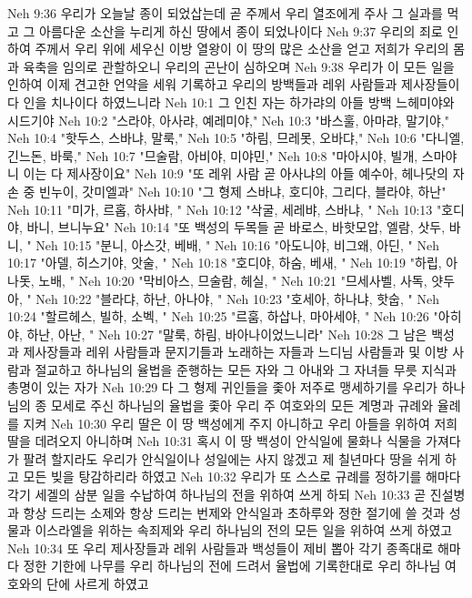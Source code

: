 Neh 9:36  우리가 오늘날 종이 되었삽는데 곧 주께서 우리 열조에게 주사 그 실과를 먹고 그 아름다운 소산을 누리게 하신 땅에서 종이 되었나이다
Neh 9:37  우리의 죄로 인하여 주께서 우리 위에 세우신 이방 열왕이 이 땅의 많은 소산을 얻고 저희가 우리의 몸과 육축을 임의로 관할하오니 우리의 곤난이 심하오며
Neh 9:38  우리가 이 모든 일을 인하여 이제 견고한 언약을 세워 기록하고 우리의 방백들과 레위 사람들과 제사장들이 다 인을 치나이다 하였느니라
Neh 10:1  그 인친 자는 하가랴의 아들 방백 느헤미야와 시드기야
Neh 10:2  "스라야, 아사랴, 예레미야,"
Neh 10:3  "바스훌, 아마랴, 말기야,"
Neh 10:4  "핫두스, 스바냐, 말룩,"
Neh 10:5  "하림, 므레못, 오바댜,"
Neh 10:6  "다니엘, 긴느돈, 바룩,"
Neh 10:7  "므술람, 아비야, 미야민,"
Neh 10:8  "마아시야, 빌개, 스마야니 이는 다 제사장이요"
Neh 10:9  "또 레위 사람 곧 아사냐의 아들 예수아, 헤나닷의 자손 중 빈누이, 갓미엘과"
Neh 10:10  "그 형제 스바냐, 호디야, 그리다, 블라야, 하난"
Neh 10:11  "미가, 르홉, 하사뱌, "
Neh 10:12  "삭굴, 세레뱌, 스바냐, "
Neh 10:13  "호디야, 바니, 브니누요"
Neh 10:14  "또 백성의 두목들 곧 바로스, 바핫모압, 엘람, 삿두, 바니, "
Neh 10:15  "분니, 아스갓, 베배, "
Neh 10:16  "아도니야, 비그왜, 아딘, "
Neh 10:17  "아델, 히스기야, 앗술, "
Neh 10:18  "호디야, 하숨, 베새, "
Neh 10:19  "하립, 아나돗, 노배, "
Neh 10:20  "막비아스, 므술람, 헤실, "
Neh 10:21  "므세사벨, 사독, 얏두아, "
Neh 10:22  "블라댜, 하난, 아나야, "
Neh 10:23  "호세아, 하나냐, 핫숩, "
Neh 10:24  "할르헤스, 빌하, 소벡, "
Neh 10:25  "르훔, 하삽나, 마아세야, "
Neh 10:26  "아히야, 하난, 아난, "
Neh 10:27  "말룩, 하림, 바아나이었느니라"
Neh 10:28  그 남은 백성과 제사장들과 레위 사람들과 문지기들과 노래하는 자들과 느디님 사람들과 및 이방 사람과 절교하고 하나님의 율법을 준행하는 모든 자와 그 아내와 그 자녀들 무릇 지식과 총명이 있는 자가
Neh 10:29  다 그 형제 귀인들을 좇아 저주로 맹세하기를 우리가 하나님의 종 모세로 주신 하나님의 율법을 좇아 우리 주 여호와의 모든 계명과 규례와 율례를 지켜
Neh 10:30  우리 딸은 이 땅 백성에게 주지 아니하고 우리 아들을 위하여 저희 딸을 데려오지 아니하며
Neh 10:31  혹시 이 땅 백성이 안식일에 물화나 식물을 가져다가 팔려 할지라도 우리가 안식일이나 성일에는 사지 않겠고 제 칠년마다 땅을 쉬게 하고 모든 빚을 탕감하리라 하였고
Neh 10:32  우리가 또 스스로 규례를 정하기를 해마다 각기 세겔의 삼분 일을 수납하여 하나님의 전을 위하여 쓰게 하되
Neh 10:33  곧 진설병과 항상 드리는 소제와 항상 드리는 번제와 안식일과 초하루와 정한 절기에 쓸 것과 성물과 이스라엘을 위하는 속죄제와 우리 하나님의 전의 모든 일을 위하여 쓰게 하였고
Neh 10:34  또 우리 제사장들과 레위 사람들과 백성들이 제비 뽑아 각기 종족대로 해마다 정한 기한에 나무를 우리 하나님의 전에 드려서 율법에 기록한대로 우리 하나님 여호와의 단에 사르게 하였고

